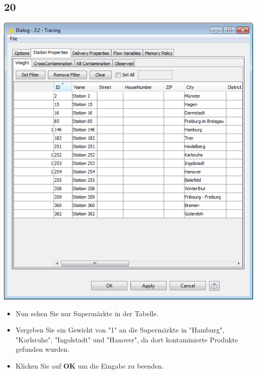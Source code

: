 \documentclass{beamer}
\begin{document}
\subsection{20}
\begin{frame}
	\begin{center}
  		\includegraphics[height=0.6\textheight]{20.png}
	\end{center}
	\begin{itemize}
		\item Nun sehen Sie nur Supermärkte in der Tabelle.
		\item Vergeben Sie ein Gewicht von "1" an die Supermärkte in "Hamburg", "Karlsruhe", "Ingolstadt" und "Hanover", da dort kontaminierte Produkte gefunden wurden.
		\item Klicken Sie auf \textbf{OK} um die Eingabe zu beenden.
	\end{itemize}
\end{frame}
\end{document}
